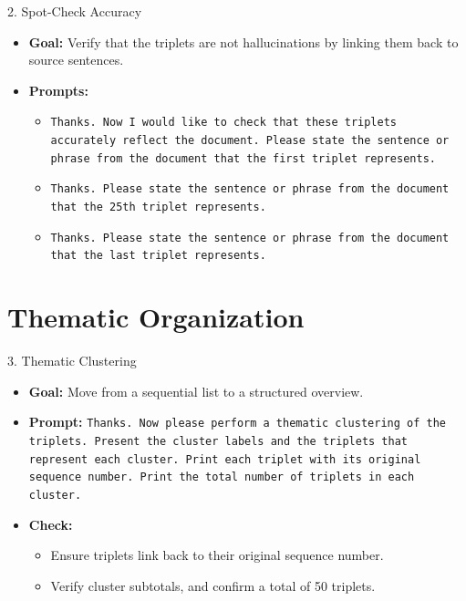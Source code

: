 \documentclass[aspectratio=169]{beamer}
\begin{document}
\begin{frame}{2. Spot-Check Accuracy}
\begin{itemize}
  \item \textbf{Goal:} Verify that the triplets are not hallucinations by linking them back to source sentences.
  \item \textbf{Prompts:}
    \begin{itemize}
      \item \texttt{Thanks. Now I would like to check that these triplets accurately reflect the document. Please state the sentence or phrase from the document that the first triplet represents.}
      \item \texttt{Thanks. Please state the sentence or phrase from the document that the 25th triplet represents.}
      \item \texttt{Thanks. Please state the sentence or phrase from the document that the last triplet represents.}
    \end{itemize}
\end{itemize}
\end{frame}

\section{Thematic Organization}

\begin{frame}{3. Thematic Clustering}
\begin{itemize}
  \item \textbf{Goal:} Move from a sequential list to a structured overview.
  \item \textbf{Prompt:} \texttt{Thanks. Now please perform a thematic clustering of the triplets. Present the cluster labels and the triplets that represent each cluster. Print each triplet with its original sequence number. Print the total number of triplets in each cluster.}
  \item \textbf{Check:}
    \begin{itemize}
      \item Ensure triplets link back to their original sequence number.
      \item Verify cluster subtotals, and confirm a total of 50 triplets.
    \end{itemize}
\end{itemize}
\end{frame}
\end{document}
